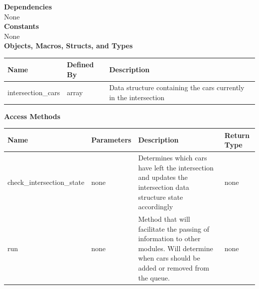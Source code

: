 \documentclass [10pt]{article}
\begin{document}
 






\textbf{Dependencies }\\
None\\

\textbf{Constants}\\ 
None\\

\textbf{Objects, Macros, Structs, and Types}\\ 
\begin{longtable}{| p{ }  p{ } p{}|} \hline

 \textbf{Name} & \textbf{Defined By} & \textbf{Description} \\\hline 
\rowcolor{tableCell} intersection\_cars& array & Data structure containing the cars currently in the intersection\\ \hline
\end{longtable}


\textbf{Access Methods}\\ 


\begin{longtable}{| p{ }  p{ } p{} p{}|} \hline

 \textbf{Name} & \textbf{Parameters} & \textbf{Description} &\textbf{Return Type} \\\hline
\rowcolor{tableCell} check\_intersection\_state & none&Determines which cars have left the intersection and updates the intersection data structure state accordingly&none\\\hline
run&none&Method that will facilitate the passing of information to other modules. Will determine when cars should be added or removed from the queue.&none\\\hline




\end{longtable}
\end{document}
